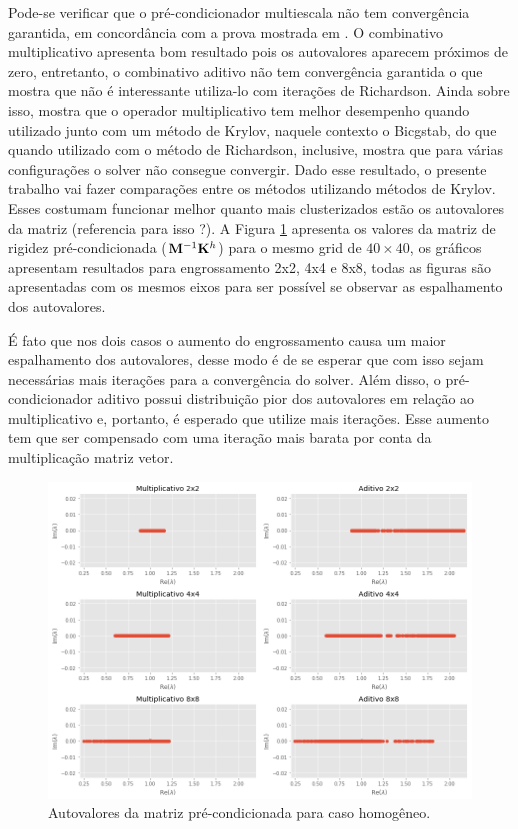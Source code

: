 Pode-se verificar que o pré-condicionador multiescala não tem convergência garantida, em concordância com a prova mostrada em \cite{zhouiterativo}. O combinativo multiplicativo apresenta bom resultado pois os autovalores aparecem próximos de zero, entretanto, o combinativo aditivo não tem convergência garantida o que mostra que não é interessante utiliza-lo com iterações de Richardson. Ainda sobre isso, \cite{casteletto} mostra que o operador multiplicativo tem melhor desempenho quando utilizado junto com um método de Krylov, naquele contexto o Bicgstab, do que quando utilizado com o método de Richardson, inclusive, mostra que para várias configurações o solver não consegue convergir. Dado esse resultado, o presente trabalho vai fazer comparações entre os métodos utilizando métodos de Krylov. Esses costumam funcionar melhor quanto mais clusterizados estão os autovalores da matriz {\color{red}(referencia para isso ?)}. A Figura \ref{fig:autovaloresMatrizPrecon} apresenta os valores da matriz de rigidez pré-condicionada ($\mathbf{M}^{-1} \mathbf{K}^h$) para o mesmo grid de $40 \times 40$, os gráficos apresentam  resultados para engrossamento 2x2, 4x4 e 8x8, todas as figuras são apresentadas com os mesmos eixos para ser possível se observar as espalhamento dos autovalores.

É fato que nos dois casos o aumento do engrossamento causa um maior espalhamento dos autovalores, desse modo é de se esperar que com isso sejam necessárias mais iterações para a convergência do solver. Além disso, o pré-condicionador aditivo possui distribuição pior dos autovalores em relação ao multiplicativo e, portanto, é esperado que utilize mais iterações. Esse aumento tem que ser compensado com uma iteração mais barata por conta da multiplicação matriz vetor.




\begin{figure}[!htbp]
\centering
\includegraphics[width=\textwidth]{chap06/figs/AutovaloresMatPrecondicionada.png}
\caption{Autovalores da matriz pré-condicionada para caso homogêneo.}
\label{fig:autovaloresMatrizPrecon}
\end{figure}



